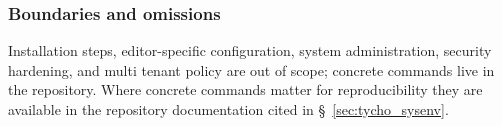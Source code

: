 \subsubsection{Boundaries and omissions}
\label{subsec:tycho_sysenv_relevance_bounds}
Installation steps, editor-specific configuration, system administration, security hardening, and multi tenant policy are out of scope; concrete commands live in the repository. Where concrete commands matter for reproducibility they are available in the repository documentation cited in \S~\ref{sec:tycho_sysenv}.